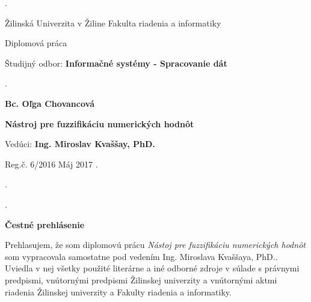 \begin{titlepage}
\phantom.

\bigskip

\begin{center}
{\sc\LARGE Žilinská Univerzita v Žiline}
\medskip
{\sc\Large Fakulta riadenia a informatiky}

\vfill\vfill\vfill\vfill

{\sc\LARGE Diplomová práca}

\medskip

{\large Študijný odbor: {\bf Informačné systémy - Spracovanie dát}}
\end{center}


\vfill\vfill\vfill\vfill


\phantom.\hfill

\begin{center}
{\large\bf Bc. Oľga Chovancová}

\medskip

{\large\bf Nástroj pre fuzzifikáciu numerických hodnôt}

\medskip

Vedúci: {\bf Ing. Miroslav Kvaššay, PhD.}
\medskip
 
\hfill
Reg.č. 6/2016
\hfill
Máj 2017
\hfill\phantom.
\end{center}

\hspace{1.7cm}\phantom.

\vspace{2.9cm}

\phantom.
\end{titlepage}



\newpage

\centerline{\bf Čestné prehlásenie}

\vspace{2em}

\noindent
Prehlasujem, že som diplomovú prácu \textit{Nástoj pre fuzzifikáciu numerických hodnôt} som vypracovala samostatne pod vedením Ing. Miroslava Kvaššaya, PhD.. Uviedla v nej všetky použité literárne a iné odborné zdroje v súlade s právnymi predpismi, vnútornými predpismi Žilinskej univerzity a vnútornými aktmi riadenia Žilinskej univerzity a Fakulty riadenia a informatiky.

